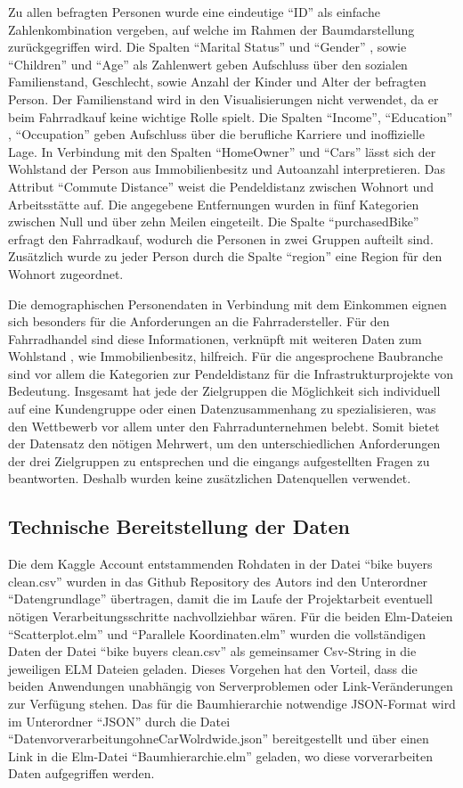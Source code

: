 \documentclass[usegeometry=true]{scrartcl}
\begin{document}
Zu allen befragten Personen wurde eine eindeutige "`ID"' als einfache Zahlenkombination vergeben, auf welche im Rahmen der Baumdarstellung zurückgegriffen wird. 
 Die Spalten "`Marital Status"' und "`Gender"' , sowie  "`Children"' und "`Age"' als Zahlenwert geben Aufschluss über den sozialen  Familienstand, Geschlecht, sowie Anzahl der Kinder und Alter der befragten Person. Der Familienstand wird in den Visualisierungen nicht verwendet, da er beim Fahrradkauf keine wichtige Rolle spielt. Die Spalten "`Income"', "`Education"' , "`Occupation"' geben Aufschluss über die berufliche Karriere und inoffizielle Lage. In Verbindung mit den Spalten "`HomeOwner"' und "`Cars"' lässt sich der Wohlstand der Person aus Immobilienbesitz und Autoanzahl interpretieren. Das Attribut "`Commute Distance"' weist die Pendeldistanz zwischen Wohnort und Arbeitsstätte auf. Die angegebene Entfernungen wurden in fünf Kategorien zwischen Null und über zehn Meilen eingeteilt. Die Spalte "`purchasedBike"' erfragt den Fahrradkauf, wodurch die Personen in zwei Gruppen aufteilt sind. Zusätzlich wurde zu jeder Person durch die Spalte "`region"' eine Region für den Wohnort zugeordnet.

Die demographischen Personendaten in Verbindung mit dem Einkommen eignen sich besonders für die Anforderungen an die Fahrradersteller. Für den Fahrradhandel sind diese Informationen, verknüpft mit weiteren Daten zum Wohlstand , wie Immobilienbesitz, hilfreich. Für die angesprochene Baubranche sind vor allem die Kategorien zur Pendeldistanz für die Infrastrukturprojekte von Bedeutung. 
Insgesamt hat jede der Zielgruppen die Möglichkeit sich individuell auf eine Kundengruppe oder einen Datenzusammenhang zu spezialisieren, was den Wettbewerb vor allem unter den Fahrradunternehmen belebt. Somit bietet der Datensatz den nötigen Mehrwert, um den unterschiedlichen Anforderungen der drei Zielgruppen zu entsprechen und die eingangs aufgestellten Fragen zu beantworten. Deshalb wurden keine zusätzlichen Datenquellen verwendet. 

\subsection{Technische Bereitstellung der Daten}


Die dem Kaggle Account \cite{Dedhia.22.09.2020} entstammenden Rohdaten in der Datei "`bike buyers clean.csv"' wurden in das Github Repository des Autors ind den Unterordner "`Datengrundlage"' übertragen, damit die im Laufe der Projektarbeit eventuell nötigen Verarbeitungsschritte nachvollziehbar wären. Für die beiden Elm-Dateien "`Scatterplot.elm"' und "`Parallele Koordinaten.elm"' wurden die vollständigen Daten der Datei "`bike buyers clean.csv"' als gemeinsamer Csv-String in die jeweiligen ELM Dateien geladen. Dieses Vorgehen hat den Vorteil, dass die beiden Anwendungen unabhängig von Serverproblemen oder Link-Veränderungen zur Verfügung stehen. Das für die Baumhierarchie notwendige JSON-Format wird im Unterordner "`JSON"' durch die Datei "`DatenvorverarbeitungohneCarWolrdwide.json"' bereitgestellt und über einen Link in die  Elm-Datei "`Baumhierarchie.elm"' geladen, wo diese vorverarbeiten Daten aufgegriffen werden. 
\end{document}
